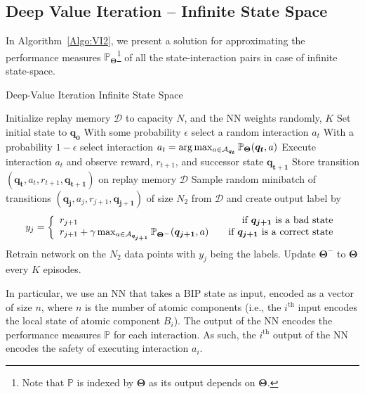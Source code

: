 \subsection{Deep Value Iteration -- Infinite State Space}
In Algorithm~\ref{Algo:VI2}, we present a solution for approximating the performance measures $\mathbb{P}_{\bm{\Theta}}$\footnote{Note that $\mathbb{P}$ is indexed by ${\bm{\Theta}}$ as its output depends on ${\bm{\Theta}}$.} of all the state-interaction pairs in case of infinite state-space.
%
\vspace*{-0.3cm}
\begin{algorithm}[h!]
\caption{Deep-Value Iteration Infinite State Space}
\label{Algo:VI2}
\begin{algorithmic}[1]
\STATE Initialize replay memory $\mathcal{D}$ to capacity $N$, and the NN weights randomly, $K$
\STATE Set initial state to $ \bm{q_{0}}$
\STATE With some probability $\epsilon$ select a random interaction $a_{t}$
\STATE With a probability $1 - \epsilon$ select interaction $a_{t} = \arg\max_{a\in {\cal A}_{\bm{q_t}}}\mathbb{P}_{\bm{\Theta}}( \bm{q_t},a)$
\STATE Execute interaction $a_{t}$ and observe reward, $r_{t+1}$, and successor state $ \bm{q_{t+1}}$
\STATE Store transition $\left( \bm{q_{t}}, a_{t}, r_{t+1},  \bm{q_{t+1}}\right)$ on replay memory $\mathcal{D}$
\STATE Sample random minibatch of transitions $\left( \bm{q_{j}}, a_{j}, r_{j+1},  \bm{q_{j+1}}\right)$ of size $N_{2}$ from $\mathcal{D}$ and create output label by 
\begin{displaymath}
   y_{j} = \left\{
     \begin{array}{lr}
       r_{j+1} & \text{if $\bm{q_{j+1}}$ is a bad state}\\
        r_{j+1} + \gamma \max_{a \in {\cal A}_{\bm{q_{j+1}}}} \mathbb{P}_{\bm{\Theta^{-}}}(\bm{q_{j+1}},a)  & \text{\quad if $\bm{q_{j+1}}$ is a correct state}
     \end{array}
   \right.
\end{displaymath} 
\ENDFOR
\STATE Retrain network on the $N_{2}$ data points with $y_{j}$ being the labels. 
\STATE Update ${\bm{\Theta^{-}}}$ to ${\bm{\Theta}}$ every $K$ episodes.
\ENDFOR
\end{algorithmic}
\end{algorithm}
\vspace*{-0.7cm}

In particular, we use an NN that takes a BIP state as input, encoded as a vector of size $n$, where $n$ is the number of atomic components (i.e., the $i^{\text{th}}$ input encodes the local state of atomic component $B_i$). The output of the NN encodes the performance measures $\mathbb{P}$ for each interaction. As such, the $i^{\text{th}}$ output of the NN encodes the safety of executing interaction $a_i$.  

